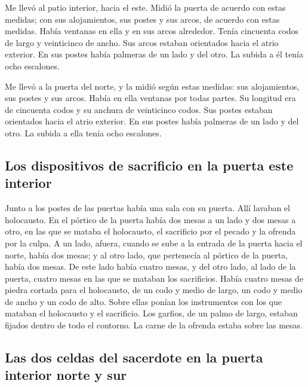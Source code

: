 \begin{paracol}{2}
 Me llevó al patio interior, hacia el este. Midió la
puerta de acuerdo con estas medidas;  con sus
alojamientos, sus postes y sus arcos, de acuerdo con estas medidas.
Había ventanas en ella y en sus arcos alrededor. Tenía cincuenta codos
de largo y veinticinco de ancho.  Sus arcos estaban
orientados hacia el atrio exterior. En sus postes había palmeras de un
lado y del otro. La subida a él tenía ocho escalones.

 Me llevó a la puerta del norte, y la midió según estas
medidas:  sus alojamientos, sus postes y sus arcos. Había
en ella ventanas por todas partes. Su longitud era de cincuenta codos y
su anchura de veinticinco codos.  Sus postes estaban
orientados hacia el atrio exterior. En sus postes había palmeras de un
lado y del otro. La subida a ella tenía ocho escalones.

\hypertarget{los-dispositivos-de-sacrificio-en-la-puerta-este-interior}{%
\subsection{Los dispositivos de sacrificio en la puerta este
interior}\label{los-dispositivos-de-sacrificio-en-la-puerta-este-interior}}

 Junto a los postes de las puertas había una sala con su
puerta. Allí lavaban el holocausto.  En el pórtico de la
puerta había dos mesas a un lado y dos mesas a otro, en las que se
mataba el holocausto, el sacrificio por el pecado y la ofrenda por la
culpa.  A un lado, afuera, cuando se sube a la entrada de
la puerta hacia el norte, había dos mesas; y al otro lado, que
pertenecía al pórtico de la puerta, había dos mesas.  De
este lado había cuatro mesas, y del otro lado, al lado de la puerta,
cuatro mesas en las que se mataban los sacrificios. 
Había cuatro mesas de piedra cortada para el holocausto, de un codo y
medio de largo, un codo y medio de ancho y un codo de alto. Sobre ellas
ponían los instrumentos con los que mataban el holocausto y el
sacrificio.  Los garfios, de un palmo de largo, estaban
fijados dentro de todo el contorno. La carne de la ofrenda estaba sobre
las mesas.

\hypertarget{las-dos-celdas-del-sacerdote-en-la-puerta-interior-norte-y-sur}{%
\subsection{Las dos celdas del sacerdote en la puerta interior norte y
sur}\label{las-dos-celdas-del-sacerdote-en-la-puerta-interior-norte-y-sur}}


\end{paracol}
